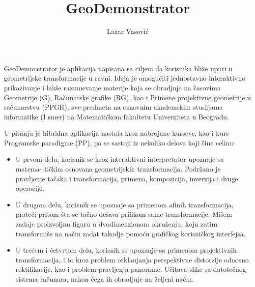 \documentclass[11pt]{article}
\title{GeoDemonstrator}
\date{}
\author{Lazar Vasovi\'c}
\begin{document}
\maketitle

GeoDemonstrator je aplikacija napisana sa ciljem da korisnika bli\v{z}e uputi u geometrijske transformacije u ravni. Ideja je omogu\'citi jednostavno interaktivno prikazivanje i lak\v{s}e razumevanje materije koja se obradjuje na \v{c}asovima Geometrije (G), Ra\v{c}unarske grafike (RG), kao i Primene projektivne geometrije u ra\v{c}unarstvu (PPGR), sve predmeta na osnovnim akademskim studijama informatike (I smer) na Matemati\v{c}kom fakultetu Univerziteta u Beogradu.

U pitanju je hibridna aplikacija nastala kroz nabrojane kurseve, kao i kurs Programske paradigme (PP), pa se sastoji iz nekoliko delova koji \v{c}ine celinu:
\begin{itemize}
\item U prvom delu, korisnik se kroz interaktivni interpretator upoznaje sa matema- ti\v{c}kim osnovana geometrijskih transformacija. Podr\v{z}ano je pravljenje ta\v{c}aka i transformacija, primena, kompozicija, inverzija i druge operacije.

\item U drugom delu, korisnik se upoznaje sa primenom afinih transformacija, prate\'ci pritom \v{s}ta se ta\v{c}no de\v{s}ava prilikom same transformacije. Mi\v{s}em zadaje proizvoljnu figuru u dvodimenzionom okru\v{z}enju, koju zatim transformi\v{s}e na na\v{c}in zadat takodje pomo\'cu grafi\v{c}kog korisni\v{c}kog interfejsa.

\item U tre\'cem i \v{c}etvrtom delu, korisnik se upoznaje sa primenom projektivnih transformacija, i to kroz problem otklanjanja perspektivne distorzije odnosno rektifikacije, kao i problem pravljenja panorame. U\v{c}itava slike sa datote\v{c}nog sistema ra\v{c}unara, nakon \v{c}ega ih obradjuje na \v{z}eljeni na\v{c}in.
\end{itemize}
\end{document}
